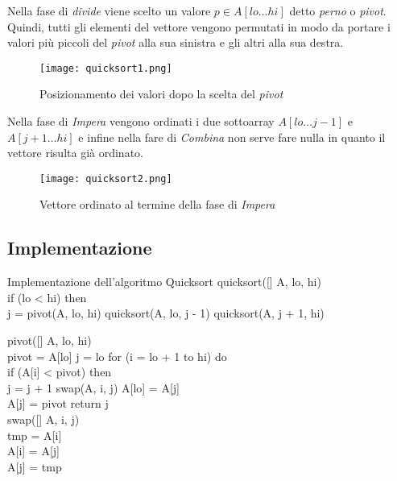 Nella fase di \emph{divide} viene scelto un valore $p\in A[lo\dots hi]$ detto
\emph{perno} o \emph{pivot}. Quindi, tutti gli elementi del vettore vengono
permutati in modo da portare i valori più piccoli del \emph{pivot} alla sua
sinistra e gli altri alla sua destra.

\begin{figure}[h!]
    \centering
    \texttt{[image: quicksort1.png]}
    \caption{Posizionamento dei valori dopo la scelta del \emph{pivot}}
\end{figure}\noindent
Nella fase di \emph{Impera} vengono ordinati i due sottoarray $A[lo\dots j-1]$
e $A[j+1\dots hi]$ e infine nella fare di \emph{Combina} non serve fare nulla in
quanto il vettore risulta già ordinato.

\begin{figure}[h!]
    \centering
    \texttt{[image: quicksort2.png]}
    \caption{Vettore ordinato al termine della fase di \emph{Impera}}
\end{figure}

\newpage
\subsection{Implementazione}
\begin{minicode}{Implementazione dell'algoritmo Quicksort}
    \ind quicksort([] A,  lo,  hi)\\
        \indf if (lo < hi) then\\
             j = pivot(A, lo, hi)\hfill{}
            quicksort(A, lo, j - 1)\hfill{}
            quicksort(A, j + 1, hi)\hfill{}

    \rmbreak\ind{} pivot([] A,  lo,  hi)\\
         pivot = A[lo]\hfill{}
         j = lo\hfill{}
        \indf for (i = lo + 1 to hi) do\\
            \indff if (A[i] < pivot) then\\
                j = j + 1\hfill{}
                swap(A, i, j)\hfill{}
        \indf A[lo] = A[j]\\
        \indf A[j] = pivot\hfill{}
        \indf return j\\

    \rmbreak\ind swap([] A,  i,  j)\\
         tmp = A[i]\\
        A[i] = A[j]\\
        A[j] = tmp
\end{minicode}

